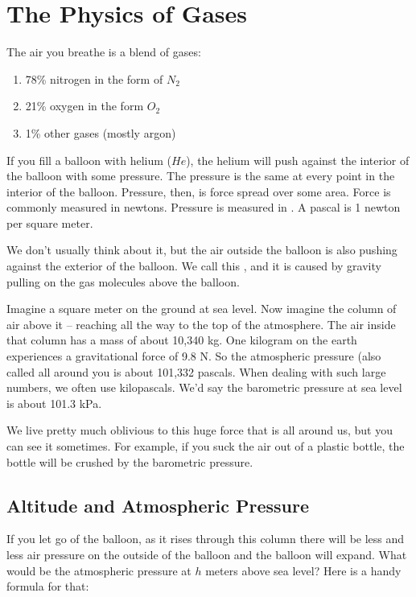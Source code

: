 \chapter{The Physics of Gases}

The air you breathe is a blend of gases:
\begin{enumerate}
\item 78\% nitrogen in the form of $N_2$
\item 21\% oxygen in the form $O_2$
\item 1\% other gases (mostly argon)
\end{enumerate}

If you fill a balloon with helium ($He$),  the helium will push against the interior of the balloon with some pressure.   
The pressure is the same at every point in the interior of the balloon.  Pressure,  then,  is force spread over some area.   
Force is commonly measured in newtons.   Pressure is measured in .  A pascal is 1 newton per square meter.

We don't usually think about it,  but the air outside the balloon is also pushing against the exterior of the balloon.  
We call this , and it is caused by gravity pulling on the gas molecules above the balloon.

Imagine a square meter on the ground at sea level.  Now imagine the column of air above it -- reaching all the way to the top of the atmosphere.   
The air inside that column has a mass of about 10,340 kg.  One kilogram on the earth experiences a gravitational force of 9.8 N.   
So the atmospheric pressure (also called  all around you is about 101,332 pascals.  
When dealing with such large numbers, we often use kilopascals.  
We'd say the barometric pressure at sea level is about 101.3 kPa.

We live pretty much oblivious to this huge force that is all around us, but you can see it sometimes.  
For example, if you suck the air out of a plastic bottle,   the bottle will be crushed by the barometric pressure.

\section{Altitude and Atmospheric Pressure}

If you let go of the balloon, as it rises through this column there will be less and less air pressure on the outside 
of the balloon and the balloon will expand.   What would be the atmospheric pressure at $h$ meters above sea level?  Here is a handy formula for that:

